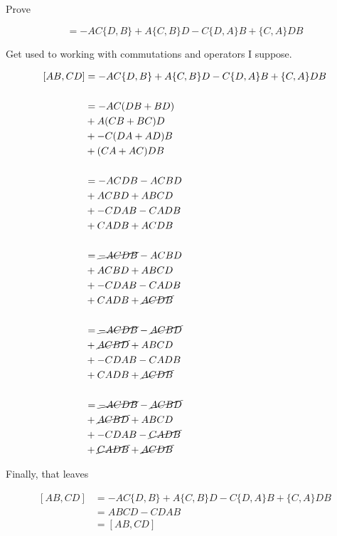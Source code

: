 \begin{question}

  Prove

  \begin{equation*}
    [AB,CD] = -AC\{D,B\} + A\{C,B\}D - C\{D,A\}B + \{C,A\}DB
  \end{equation*}

\end{question}

\begin{purpose}
  Get used to working with commutations and operators I suppose.
\end{purpose}

\begin{answer}
  \begin{equation*}
    \begin{split}
      [AB,CD] &= -AC\{D,B\} + A\{C,B\}D - C\{D,A\}B + \{C,A\}DB \\
      \\
      &= -AC(DB+BD) \\
      &+ A(CB+BC)D \\
      &+ -C(DA+AD)B \\
      &+ (CA+AC)DB \\
      \\
      &= -ACDB - ACBD \\
      &+ ACBD + ABCD \\
      &+ -CDAB - CADB \\
      &+ CADB + ACDB \\
      \\
      &= \cancel{-ACDB} - ACBD \\
      &+ ACBD + ABCD \\
      &+ -CDAB - CADB \\
      &+ CADB + \cancel{ACDB} \\
      \\
      &= \cancel{-ACDB} - \cancel{ACBD} \\
      &+ \cancel{ACBD} + ABCD \\
      &+ -CDAB - CADB \\
      &+ CADB + \cancel{ACDB} \\
      \\
      &= \cancel{-ACDB} - \cancel{ACBD} \\
      &+ \cancel{ACBD} + ABCD \\
      &+ -CDAB - \cancel{CADB} \\
      &+ \cancel{CADB} + \cancel{ACDB} \\
    \end{split}
  \end{equation*}

  Finally, that leaves

  \begin{equation}
    \begin{split}
      [AB,CD] &= -AC\{D,B\} + A\{C,B\}D - C\{D,A\}B + \{C,A\}DB \\
      &= ABCD - CDAB \\
      &= [AB,CD]
    \end{split}
  \end{equation}
\end{answer}
